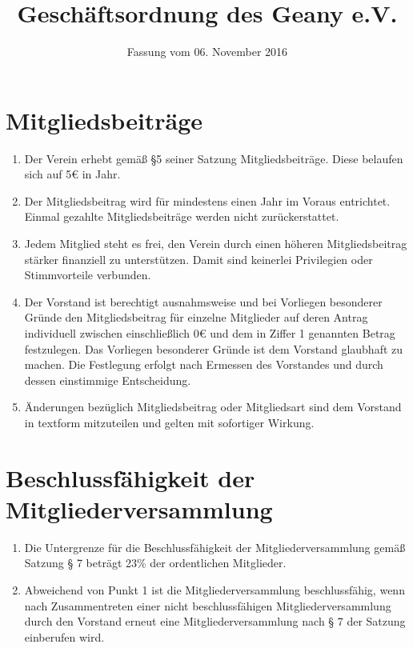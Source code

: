 \documentclass[fontsize=12pt,paper=a4,pagesize,headings=small]{scrartcl}
\title{Geschäftsordnung des Geany e.V.}
\date{Fassung vom 06. November 2016}
\begin{document}
\maketitle{}

\section{Mitgliedsbeiträge}
\begin{enumerate}
    \item Der Verein erhebt gemäß §5 seiner Satzung Mitgliedsbeiträge.
        Diese belaufen sich auf 5\euro{} in Jahr.

    \item Der Mitgliedsbeitrag wird für mindestens einen Jahr im Voraus
        entrichtet. Einmal gezahlte Mitgliedsbeiträge werden nicht
        zurückerstattet.

    \item Jedem Mitglied steht es frei, den Verein durch einen höheren
        Mitgliedsbeitrag stärker finanziell zu unterstützen. Damit sind
        keinerlei Privilegien oder Stimmvorteile verbunden.

    \item Der Vorstand ist berechtigt ausnahmsweise und bei Vorliegen
        besonderer Gründe den Mitgliedsbeitrag für einzelne Mitglieder
        auf deren Antrag individuell zwischen einschließlich 0\euro{}
        und dem in Ziffer 1 genannten Betrag festzulegen. Das Vorliegen
        besonderer Gründe ist dem Vorstand glaubhaft zu machen. Die
        Festlegung erfolgt nach Ermessen des Vorstandes und durch dessen
        einstimmige Entscheidung.

    \item Änderungen bezüglich Mitgliedsbeitrag oder Mitgliedsart sind dem
        Vorstand in textform mitzuteilen und gelten mit sofortiger Wirkung.
\end{enumerate}


\section{Beschlussfähigkeit der Mitgliederversammlung}
\begin{enumerate}
    \item Die Untergrenze für die Beschlussfähigkeit der
        Mitgliederversammlung gemäß Satzung § 7 beträgt 23\% der
        ordentlichen Mitglieder.

    \item Abweichend von Punkt 1 ist die Mitgliederversammlung
        beschlussfähig, wenn nach Zusammentreten einer nicht
        beschlussfähigen Mitgliederversammlung durch den
        Vorstand erneut eine Mitgliederversammlung nach § 7 der Satzung
        einberufen wird.
\end{enumerate}
\end{document}
